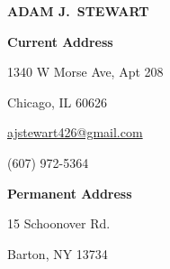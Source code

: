 

\begin{center}

    \textbf{\uppercase{\Large Adam J.\ Stewart}}

\end{center}

\vspace{-12pt}

\begin{multicols}{3}

    \begin{flushleft}

        \textbf{Current Address}

        1340 W Morse Ave, Apt 208

        Chicago, IL 60626

    \end{flushleft}

    \columnbreak

    \begin{center}

        \href{mailto:ajstewart426@gmail.com}{ajstewart426@gmail.com}

        (607) 972-5364

    \end{center}

    \columnbreak

    \begin{flushright}

        \textbf{Permanent Address}

        15 Schoonover Rd.

        Barton, NY 13734

    \end{flushright}

\end{multicols}
